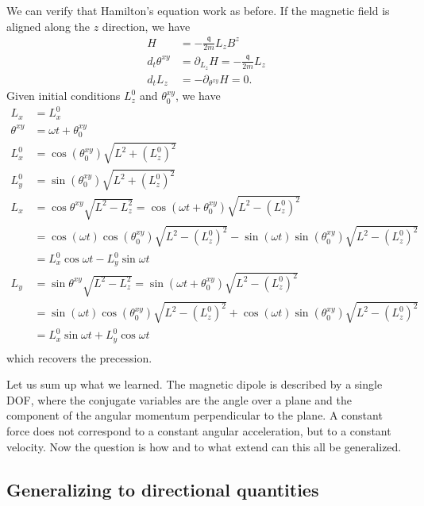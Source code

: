 We can verify that Hamilton's equation work as before. If the magnetic field is aligned along the $z$ direction, we have
\begin{equation}
	\begin{aligned}
		H &= - \frac{\mathfrak{q}}{2m} L_z B^z \\
		d_t \theta^{xy} &= \partial_{L_z} H = - \frac{\mathfrak{q}}{2m} L_z \\
		d_t L_z &= - \partial_{\theta^{xy}} H = 0.
	\end{aligned}
\end{equation}
Given initial conditions $L_z^0$ and $\theta^{xy}_0$, we have
\begin{equation}
	\begin{aligned}
		L_x &= L_x^0 \\
		\theta^{xy} &= \omega t + \theta^{xy}_0 \\
		L_x^0 &= \cos(\theta^{xy}_0)\sqrt{L^2 + (L_z^0)^2} \\
		L_y^0 &= \sin(\theta^{xy}_0)\sqrt{L^2 + (L_z^0)^2} \\
		L_x &= \cos\theta^{xy} \sqrt{L^2 - L_z^2} = \cos(\omega t + \theta^{xy}_0) \sqrt{L^2 - (L_z^0)^2} \\
		&= \cos(\omega t)\cos(\theta^{xy}_0) \sqrt{L^2 - (L_z^0)^2} - \sin(\omega t)\sin(\theta^{xy}_0) \sqrt{L^2 - (L_z^0)^2} \\
		&= L_x^0 \cos \omega t - L_y^0 \sin \omega t \\
		L_y &= \sin\theta^{xy} \sqrt{L^2 - L_z^2} = \sin(\omega t + \theta^{xy}_0) \sqrt{L^2 - (L_z^0)^2} \\
		&= \sin(\omega t)\cos(\theta^{xy}_0) \sqrt{L^2 - (L_z^0)^2} + \cos(\omega t)\sin(\theta^{xy}_0) \sqrt{L^2 - (L_z^0)^2} \\
		&= L_x^0 \sin \omega t + L_y^0 \cos \omega t \\
	\end{aligned}
\end{equation}
which recovers the precession.

Let us sum up what we learned. The magnetic dipole is described by a single DOF, where the conjugate variables are the angle over a plane and the component of the angular momentum perpendicular to the plane. A constant force does not correspond to a constant angular acceleration, but to a constant velocity. Now the question is how and to what extend can this all be generalized.


\subsection{Generalizing to directional quantities}

